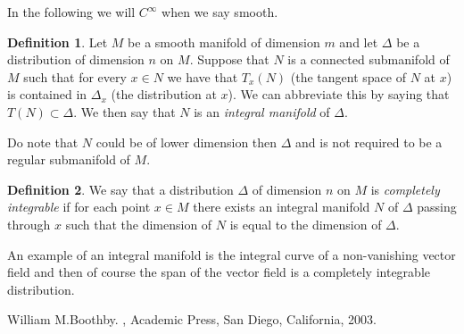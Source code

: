 \documentclass[12pt]{article}
\theoremstyle{theorem}
\theoremstyle{definition}
\newtheorem*{defn}{Definition}
\begin{document}
In the following we will  $C^\infty$ when we say smooth.

\begin{defn}
Let $M$ be a smooth manifold of dimension $m$ and let $\Delta$ be a
distribution of dimension $n$ on $M$.  Suppose that $N$ is a connected
submanifold of $M$ such that for every $x \in N$ we have that
$T_x(N)$ (the tangent space of $N$ at $x$) is contained in $\Delta_x$
(the distribution at $x$).  We can abbreviate this by saying that
$T(N) \subset \Delta$.  We then say that $N$ is an {\em integral manifold}
of $\Delta$.
\end{defn}

Do note that $N$ could be of lower dimension then $\Delta$
and is not required to be a regular submanifold of $M$.

\begin{defn}
We say that a distribution $\Delta$ of dimension $n$ on $M$
is {\em completely integrable} if for
each point $x \in M$ there exists an integral manifold $N$ of $\Delta$ 
passing through $x$ such that the dimension of $N$ is equal to the dimension
of $\Delta$.
\end{defn}

An example of an integral manifold is the integral curve
of a non-vanishing vector field and then of course the span of the
vector field is a completely integrable distribution.

\begin{thebibliography}{9}
William M.\@ Boothby.
{\em {}},
Academic Press, San Diego, California, 2003.
\end{thebibliography}
\end{document}
